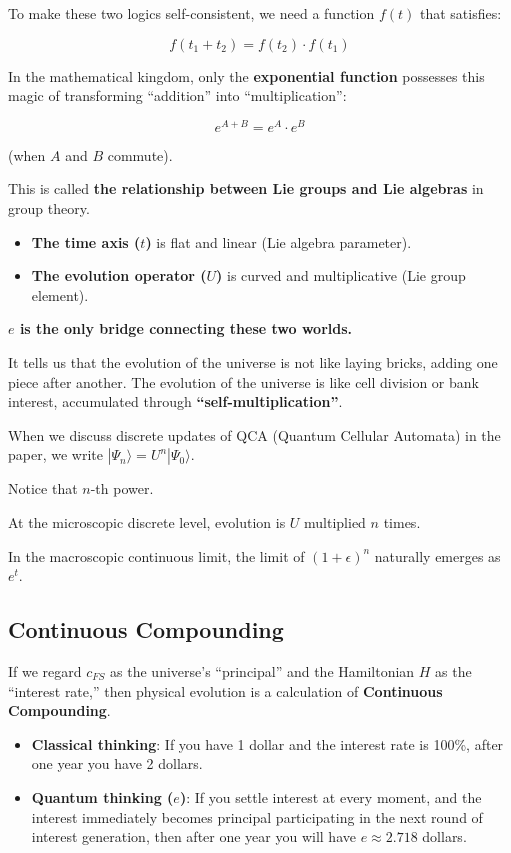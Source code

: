 \documentclass[11pt,a4paper,twoside]{book}
\begin{document}
To make these two logics self-consistent, we need a function $f(t)$ that satisfies:

$$f(t_1 + t_2) = f(t_2) \cdot f(t_1)$$

In the mathematical kingdom, only the \textbf{exponential function} possesses this magic of transforming ``addition'' into ``multiplication'':

$$e^{A+B} = e^A \cdot e^B$$

(when $A$ and $B$ commute).

This is called \textbf{the relationship between Lie groups and Lie algebras} in group theory.

\begin{itemize}
\item \textbf{The time axis ($t$)} is flat and linear (Lie algebra parameter).

\item \textbf{The evolution operator ($U$)} is curved and multiplicative (Lie group element).
\end{itemize}

\textbf{$e$ is the only bridge connecting these two worlds.}

It tells us that the evolution of the universe is not like laying bricks, adding one piece after another. The evolution of the universe is like cell division or bank interest, accumulated through \textbf{``self-multiplication''}.

When we discuss discrete updates of QCA (Quantum Cellular Automata) in the paper, we write $|\Psi_n\rangle = U^n |\Psi_0\rangle$.

Notice that $n$-th power.

At the microscopic discrete level, evolution is $U$ multiplied $n$ times.

In the macroscopic continuous limit, the limit of $(1 + \epsilon)^n$ naturally emerges as $e^{t}$.

\subsection{Continuous Compounding}

If we regard $c_{FS}$ as the universe's ``principal'' and the Hamiltonian $H$ as the ``interest rate,'' then physical evolution is a calculation of \textbf{Continuous Compounding}.

\begin{itemize}
\item \textbf{Classical thinking}: If you have 1 dollar and the interest rate is 100\%, after one year you have 2 dollars.

\item \textbf{Quantum thinking ($e$)}: If you settle interest at every moment, and the interest immediately becomes principal participating in the next round of interest generation, then after one year you will have $e \approx 2.718$ dollars.
\end{itemize}
\end{document}
